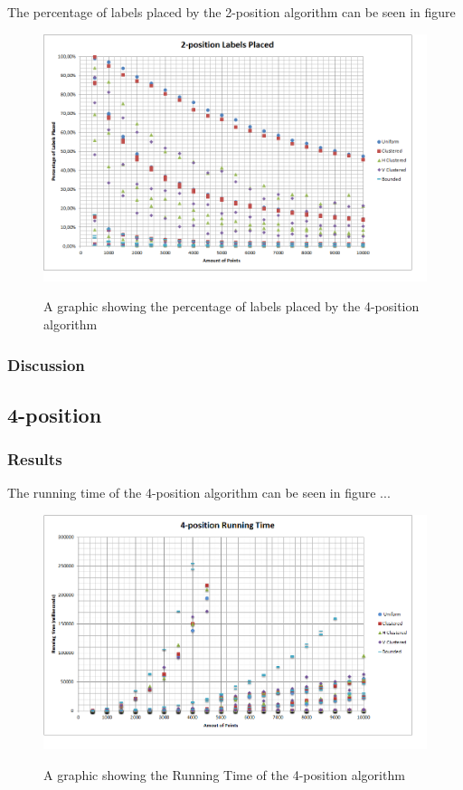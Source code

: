 \documentclass[crop=false,a4paper,oneside,11pt]{standalone}
\begin{document}
The percentage of labels placed by the 2-position algorithm can be seen in figure \begin{figure}[h!]
 \centering
  \includegraphics[scale = 0.5]{2PosLabelsPlaced.png}\\
  \caption{A graphic showing the percentage of labels placed by the 4-position algorithm}
 \end{figure}
\subsubsection{Discussion}

\subsection{4-position}
\subsubsection{Results}
The running time of the 4-position algorithm can be seen in figure ...
 \begin{figure}[h!]
 \centering
 \includegraphics[scale = 0.5]{4PosRunningTime.png}\\
 \caption{A graphic showing the Running Time of the 4-position algorithm}
 \end{figure}
\end{document}
